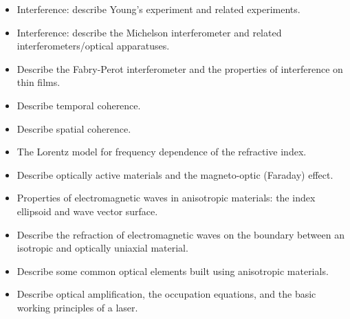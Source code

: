 \begin{itemize}

    \item Interference: describe Young's experiment and related experiments.

    \item Interference: describe the Michelson interferometer and related interferometers/optical apparatuses.

    \item Describe the Fabry-Perot interferometer and the properties of interference on thin films.

    \item Describe temporal coherence.

    \item Describe spatial coherence.
    
    \item The Lorentz model for frequency dependence of the refractive index.

    \item Describe optically active materials and the magneto-optic (Faraday) effect.

    \item Properties of electromagnetic waves in anisotropic materials: the index ellipsoid and wave vector surface.

    \item Describe the refraction of electromagnetic waves on the boundary between an isotropic and optically uniaxial material.

    \item Describe some common optical elements built using anisotropic materials.

    \item Describe optical amplification, the occupation equations, and the basic working principles of a laser.

\end{itemize}



